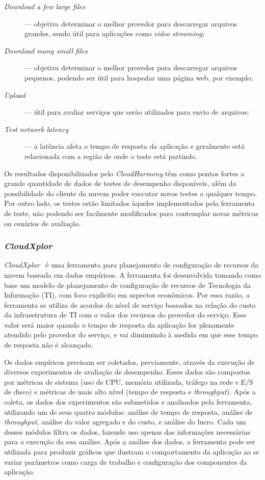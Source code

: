 \begin{description}
  \item[\em Download a few large files] --- objetiva determinar o melhor provedor
  para descarregar arquivos grandes, sendo útil para aplicações como {\em video
  streaming};
  \item[\em Download many small files] --- objetiva determinar o melhor provedor
  para descarregar arquivos pequenos, podendo ser útil para hospedar uma página
  web, por exemplo;
  \item[\em Upload] --- útil para avaliar serviços que serão utilizados para
  envio de arquivos;
  \item[\em Test network latency] --- a latência afeta o tempo de resposta da
  aplicação e geralmente está relacionada com a região de onde o teste está
  partindo.
\end{description}

Os resultados disponibilizados pelo {\em CloudHarmony} têm como pontos fortes a
grande quantidade de dados de testes de desempenho disponíveis, além da possibilidade do cliente da
nuvem poder executar novos testes a qualquer tempo. Por outro lado, os testes estão limitados àqueles implementados pela ferramenta de teste, não podendo ser facilmente modificados para contemplar novas métricas ou cenários de avaliação.

\subsubsection{{\em CloudXplor}}

{\em CloudXplor}~\cite{malkowski2010cloudxplor} é uma ferramenta para
planejamento de configuração de recursos da nuvem baseada em dados empíricos. A ferramenta
foi desenvolvida tomando como base um modelo de planejamento de configuração de
recursos de Tecnologia da Informação (TI), com foco explícito em aspectos econômicos.
Por essa razão, a ferramenta se utiliza de acordos de nível de serviço baseados na relação do custo
da infraestrutura de TI com o valor dos recursos do provedor do serviço. Esse
valor será maior quando o tempo de resposta da aplicação for plenamente atendido
pelo provedor do serviço, e vai diminuindo à medida em que esse tempo de resposta
não é alcançado.

Os dados empíricos precisam ser coletados, previamente, através da execução de diversos experimentos de avaliação de desempenho. Esses dados
são compostos por métricas de sistema (uso de CPU, memória utilizada, tráfego na rede e E/S de disco) e métricas de mais alto nível (tempo de resposta e \textit{throughput}). Após a coleta, os dados dos experimentos são submetidos e analisados pela ferramenta, utilizando um de seus quatro módulos: análise de tempo de
resposta, análise de \textit{throughput}, análise do valor agregado e do custo,
e análise do lucro. Cada um desses módulos filtra os dados, fazendo uso apenas
das informações necessárias para a execução da sua análise. Após a análise dos
 dados, a ferramenta pode ser utilizada para produzir gráficos que ilustram o comportamento da aplicação ao se variar
parâmetros como carga de trabalho e configuração dos componentes da aplicação.


